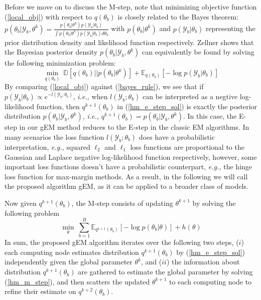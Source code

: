 \documentclass{article}
\newcommand{\ie}[0]{\emph{i.e., }}
\newcommand{\eg}[0]{\emph{e.g., }}
\newcommand{\1}[0]{\ensuremath{\boldsymbol{1}}\xspace}
\begin{document}
Before we move on to discuss the M-step, note that minimizing objective function (\ref{local_obj}) with respect to $q(\theta_b)$ is closely related to the Bayes theorem: $p(\theta_b|\mathcal{Y}_b, \theta^k) = \frac{p(\theta_b|\theta^k)p(\mathcal{Y}_b|\theta_b)}{\int p(\theta_b|\theta^k)p(\mathcal{Y}_b|\theta_b)d\theta_b}$ with $p(\theta_b|\theta^k)$ and $p(\mathcal{Y}_b|\theta_b)$ representing the prior distribution density and likelihood function respectively. Zellner  shows that the Bayesian posterior density $p(\theta_b|\mathcal{Y}_b, \theta^k)$ can equivalently be found by solving the following minimization problem:
\begin{equation}\label{bayes_rule}
\textstyle \min_{q(\theta_b)} ~\mathbb{D}[q(\theta_b)||p(\theta_b|\theta^k)] + \mathbb{E}_{q(\theta_b)}[-\log p(\mathcal{Y}_b|\theta_b)]
\end{equation}
By comparing (\ref{local_obj}) against (\ref{bayes_rule}), we see that if $p(\mathcal{Y}_b|\theta_b) \propto e^{-l(\mathcal{Y}_b; \theta_b)}$, \ie when $l(\mathcal{Y}_b; \theta_b)$ can be interpreted as a negtive log-likelihood function, then $q^{k+1}(\theta_b)$ in (\ref{hm_e_step_sol}) is exactly the posterior distribution $p(\theta_b|\mathcal{Y}_b, \theta^k)$, \ie $q^{k+1}(\theta_b) = p(\theta_b|\mathcal{Y}_b, \theta^k)$. In this case, the E-step in our gEM method reduces to the E-step in the classic EM algorithms. In many scenarios the loss function $l(\mathcal{Y}_b; \theta_b)$ does have a probabilistic interpretation, \eg  squared $\ell_2$ and $\ell_1$ loss functions are proportional to the  Gaussian and Laplace negative log-likelihood function respectively, however, some important loss functions doesn't have a probabilistic counterpart, \eg the hinge loss function for max-margin methods. As a result, in the following we will call the proposed algorithm gEM, as it can be applied to a broader class of models. 

Now given $q^{k+1}(\theta_b)$, the M-step consists of updating $\theta^{k+1}$ by solving the following problem
\begin{equation}\label{hm_m_step}
\min_{\theta}~\textstyle\sum_{b=1}^B\mathbb{E}_{q^{k+1}(\theta_b)}[-\log p(\theta_b|\theta)] + h(\theta)
\end{equation}
In sum, the proposed gEM algorithm iterates over the following two steps, ($i$) each computing node estimates distribution $q^{k+1}(\theta_b)$ by (\ref{hm_e_step_sol}) independently given the global parameter $\theta^k$, and ($ii$) the information about distribution $q^{k+1}(\theta_b)$ are gathered to estimate the global parameter by solving (\ref{hm_m_step}), and then scatters the updated $\theta^{k+1}$ to each computing node to refine their estimate on $q^{k+2}(\theta_b)$.
\end{document}
